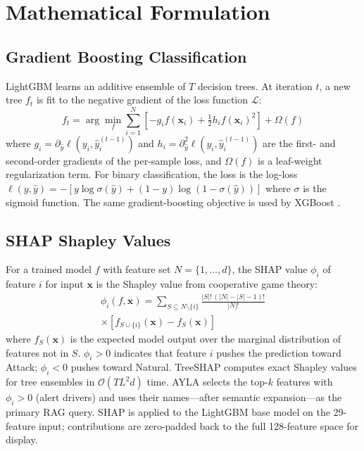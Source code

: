 \documentclass[twocolumn, 10pt, letterpaper]{article}
\begin{document}
\section{Mathematical Formulation}
\label{app:math}

\subsection*{Gradient Boosting Classification}

LightGBM \cite{ke2017lightgbm} learns an additive ensemble of $T$ decision trees.
At iteration $t$, a new tree $f_t$ is fit to the negative gradient of the
loss function $\mathcal{L}$:
\begin{equation}
    f_t = \arg\min_{f} \sum_{i=1}^{N}
    \left[
        -g_i f(\mathbf{x}_i) + \tfrac{1}{2} h_i f(\mathbf{x}_i)^2
    \right]
    + \Omega(f)
\end{equation}
where $g_i = \partial_{\hat{y}} \ell(y_i, \hat{y}_i^{(t-1)})$ and
$h_i = \partial^2_{\hat{y}} \ell(y_i, \hat{y}_i^{(t-1)})$ are the first- and
second-order gradients of the per-sample loss, and $\Omega(f)$ is a
leaf-weight regularization term.
For binary classification, the loss is the log-loss
$\ell(y, \hat{y}) = -[y \log \sigma(\hat{y}) + (1{-}y)\log(1{-}\sigma(\hat{y}))]$
where $\sigma$ is the sigmoid function.
The same gradient-boosting objective is used by XGBoost \cite{chen2016xgboost}.

\subsection*{SHAP Shapley Values}

For a trained model $f$ with feature set $N = \{1, \ldots, d\}$,
the SHAP value $\phi_i$ of feature $i$ for input $\mathbf{x}$ is the
Shapley value from cooperative game theory:
\begin{equation}
\begin{split}
    \phi_i(f, \mathbf{x}) = \sum_{S \subseteq N \setminus \{i\}}
    \frac{|S|!\,(|N|-|S|-1)!}{|N|!} \\
    \times \left[ f_{S \cup \{i\}}(\mathbf{x}) - f_S(\mathbf{x}) \right]
\end{split}
\end{equation}
where $f_S(\mathbf{x})$ is the expected model output over the marginal distribution
of features not in $S$.
$\phi_i > 0$ indicates that feature $i$ pushes the prediction toward Attack;
$\phi_i < 0$ pushes toward Natural.
TreeSHAP \cite{lundberg2020treeshap} computes exact Shapley values for tree
ensembles in $\mathcal{O}(TL^2 d)$ time.
AYLA selects the top-$k$ features with $\phi_i > 0$ (alert drivers)
and uses their names---after semantic expansion---as the primary RAG query.
SHAP is applied to the LightGBM base model on the 29-feature input;
contributions are zero-padded back to the full 128-feature space for display.
\end{document}
